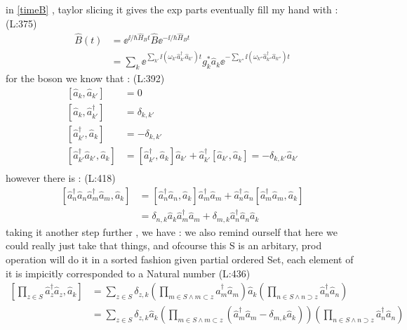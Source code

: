  in \eqref{timeB}  , taylor slicing it gives 
 the exp parts eventually fill my hand with :
(L:375)
\begin{equation}
\begin{split}
\hat{B }(t )&=\ee ^{\ii /\hbar \hat{H }_{B }t }\hat{B }\ee ^{-\ii /\hbar \hat{H }_{B }t }\\
&=\sum _{k }\ee ^{\sum _{k '}\ii \left(\omega _{k '}\hat{a }^\dagger _{k '}\hat{a }_{k '}\right)t }g _{k }^*\hat{a }_{k }\ee ^{-\sum _{k ''}\ii \left(\omega _{k ''}\hat{a }^\dagger _{k ''}\hat{a }_{k ''}\right)t }\end{split}
\end{equation}
 for the boson we know that : 
(L:392)
\begin{equation}
\begin{split}
\left[\hat{a }_{k },\hat{a }_{k '}\right]&=0\\
\left[\hat{a }_{k },\hat{a }^\dagger _{k '}\right]&=\delta _{k ,k '}\\
\left[\hat{a }^\dagger _{k '},\hat{a }_{k }\right]&=-\delta _{k ,k '}\\
\left[\hat{a }^\dagger _{k '}\hat{a }_{k '},\hat{a }_{k }\right]&=\left[\hat{a }^\dagger _{k '},\hat{a }_{k }\right]\hat{a }_{k '}+\hat{a }^\dagger _{k '}\left[\hat{a }_{k '},\hat{a }_{k }\right]=-\delta _{k ,k '}\hat{a }_{k '}\\
\end{split}
\end{equation}
 however there is :
(L:418)
\begin{equation}
\begin{split}
\left[\hat{a }^\dagger _{n }\hat{a }_{n }\hat{a }^\dagger _{m }\hat{a }_{m },\hat{a }_{k }\right]&=\left[\hat{a }^\dagger _{n }\hat{a }_{n },\hat{a }_{k }\right]\hat{a }^\dagger _{m }\hat{a }_{m }+\hat{a }^\dagger _{n }\hat{a }_{n }\left[\hat{a }^\dagger _{m }\hat{a }_{m },\hat{a }_{k }\right]\\
&=\delta _{n ,k }\hat{a }_{k }\hat{a }^\dagger _{m }\hat{a }_{m }+\delta _{m ,k }\hat{a }^\dagger _{n }\hat{a }_{n }\hat{a }_{k }\end{split}
\end{equation}
 taking it another step further , we have : 
 we  also remind ourself that here we could really just take that things, and ofcourse  this S is an arbitary, prod operation will do it in a sorted fashion
given partial ordered Set, each element of it is impicitly corresponded to a Natural number 
(L:436)
\begin{equation}
\begin{split}
\label{prodadao}\left[\prod _{z \in S }\hat{a }^\dagger _{z }\hat{a }_{z },\hat{a }_{k }\right]&=\sum _{z \in S }\delta _{z ,k }\left(\prod _{m \in S \wedge m \subset z }\hat{a }^\dagger _{m }\hat{a }_{m }\right)\hat{a }_{k }\left(\prod _{n \in S \wedge n \supset z }\hat{a }^\dagger _{n }\hat{a }_{n }\right)\\
&=\sum _{z \in S }\delta _{z ,k }\hat{a }_{k }\left(\prod _{m \in S \wedge m \subset z }(\hat{a }^\dagger _{m }\hat{a }_{m }-\delta _{m ,k }\hat{a }_{k })\right)\left(\prod _{n \in S \wedge n \supset z }\hat{a }^\dagger _{n }\hat{a }_{n }\right)\end{split}
\end{equation}
